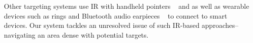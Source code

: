 Other targeting systems use IR with handheld pointers ~\cite{swindells_that_2002} and as well as wearable devices such as rings and Bluetooth audio earpieces ~\cite{merrill_augmenting_2007} to connect to smart devices. Our system tackles an unresolved issue of such IR-based approaches-- navigating an area dense with potential targets.
